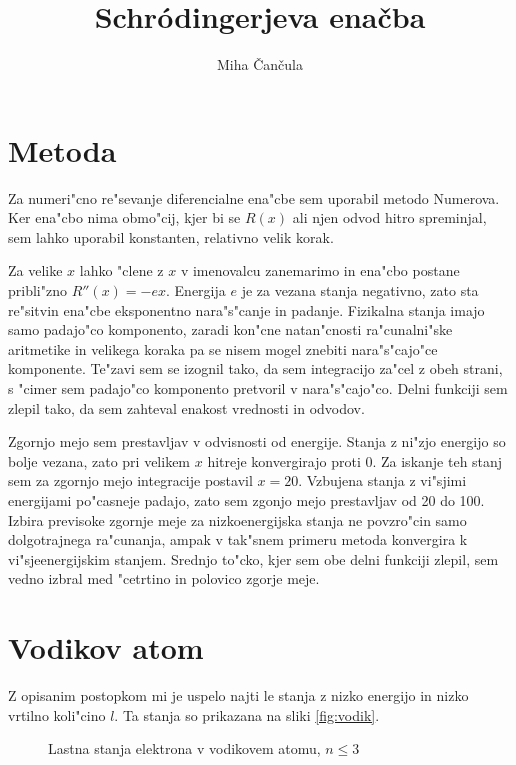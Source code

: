 \documentclass[a4paper,10pt]{article}
\title{Schr\' odingerjeva ena\v cba}
\author{Miha \v Can\v cula}
\begin{document}
\maketitle

\section{Metoda}

Za numeri"cno re"sevanje diferencialne ena"cbe sem uporabil metodo Numerova. Ker ena"cbo nima obmo"cij, kjer bi se $R(x)$ ali njen odvod hitro spreminjal, sem lahko uporabil konstanten, relativno velik korak. 

Za velike $x$ lahko "clene z $x$ v imenovalcu zanemarimo in ena"cbo postane pribli"zno $R''(x) = -ex$. Energija $e$ je za vezana stanja negativno, zato sta re"sitvin ena"cbe eksponentno nara"s"canje in padanje. Fizikalna stanja imajo samo padajo"co komponento, zaradi kon"cne natan"cnosti ra"cunalni"ske aritmetike in velikega koraka pa se nisem mogel znebiti nara"s"cajo"ce komponente. Te"zavi sem se izognil tako, da sem integracijo za"cel z obeh strani, s "cimer sem padajo"co komponento pretvoril v nara"s"cajo"co. Delni funkciji sem zlepil tako, da sem zahteval enakost vrednosti in odvodov. 

Zgornjo mejo sem prestavljav v odvisnosti od energije. Stanja z ni"zjo energijo so bolje vezana, zato pri velikem $x$ hitreje konvergirajo proti 0. Za iskanje teh stanj sem za zgornjo mejo integracije postavil $x=20$. Vzbujena stanja z vi"sjimi energijami po"casneje padajo, zato sem zgonjo mejo prestavljav od 20 do 100. Izbira previsoke zgornje meje za nizkoenergijska stanja ne povzro"cin samo dolgotrajnega ra"cunanja, ampak v tak"snem primeru metoda konvergira k vi"sjeenergijskim stanjem. Srednjo to"cko, kjer sem obe delni funkciji zlepil, sem vedno izbral med "cetrtino in polovico zgorje meje. 

\section{Vodikov atom}

Z opisanim postopkom mi je uspelo najti le stanja z nizko energijo in nizko vrtilno koli"cino $l$. Ta stanja so prikazana na sliki \ref{fig:vodik}. 

\begin{figure}[h]
 
 \caption{Lastna stanja elektrona v vodikovem atomu, $n \leq 3$}
 \label{fig:vodik-123}
\end{figure}
\end{document}
